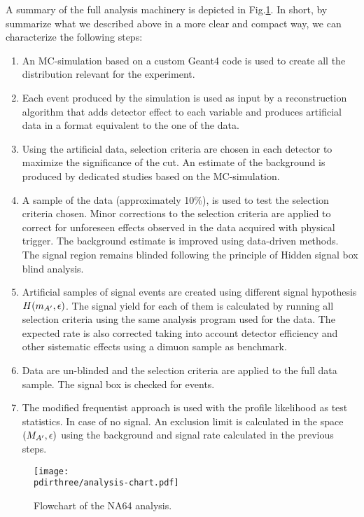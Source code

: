 A summary of the full analysis machinery is depicted in Fig.\ref{fig:analysis-chart}. In short, by summarize what we described above in a more clear and compact way, we can characterize the following steps:

\begin{enumerate}
\item An MC-simulation based on a custom Geant4 code is used to create all the distribution relevant for the experiment.
\item Each event produced by the simulation is used as input by a reconstruction algorithm that adds detector effect to each variable and produces artificial data in a format equivalent to the one of the data.
\item Using the artificial data, selection criteria are chosen in each detector to maximize the significance of the cut. An estimate of the background is produced by dedicated studies based on the MC-simulation.
\item A sample of the data (approximately 10\%), is used to test the selection criteria chosen. Minor corrections to the selection criteria are applied to correct for unforeseen effects observed in the data acquired with physical trigger. The background estimate is improved using data-driven methods. The signal region remains blinded following the principle of Hidden signal box blind analysis.
\item Artificial samples of signal events are created using different signal hypothesis $H(m_{A'},\epsilon)$. The signal yield for each of them is calculated by running all selection criteria using the same analysis program used for the data. The expected rate is also corrected taking into account detector efficiency and other sistematic effects using a dimuon sample as benchmark.  
\item Data are un-blinded and the selection criteria are applied to the full data sample. The signal box is checked for events.
\item The modified frequentist approach is used with the profile likelihood as test statistics. In case of no signal. An exclusion limit is calculated in the space $(M_{A'},\epsilon)$ using the background and signal rate calculated in the previous steps.
\end{enumerate}

\begin{figure}[bth!]
  \centering
  \texttt{[image: \\pdirthree/analysis-chart.pdf]}
  \caption{Flowchart of the NA64 analysis.}
  \label{fig:analysis-chart}
\end{figure}

